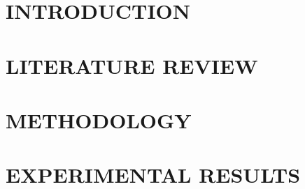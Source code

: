 \documentclass[a4paper,13pt,3p,oneside]{report}
\theoremstyle{definition}
\begin{document}
\renewcommand{\listtablename}{LIST OF TABLES}
{\let\oldnumberline\numberline
\renewcommand{\numberline}{Table~\oldnumberline}
\listoftables}

\glsaddall 
\renewcommand*{\acronymname}{LIST OF ABBREVIATIONS}
\renewcommand*{\entryname}{Abbreviation}
\renewcommand*{\descriptionname}{Definition}
\printnoidxglossaries

\renewcommand\appendixname{APPENDIX}
\renewcommand\appendixpagename{APPENDIX}
\renewcommand\appendixtocname{APPENDIX}

\renewcommand{\figurename}{Figure}
\renewcommand{\tablename}{Table}
\renewcommand{\chaptername}{CHAPTER}



\newpage
{}

\pagestyle{fancy}
\fancyhf{}
\fancyhead[RE, LO]{\leftmark}
\fancyfoot[LO]{\thepage}

\chapter{INTRODUCTION}
\label{chapter:intro}

\newpage
\chapter{LITERATURE REVIEW}
\label{chapter:literature}



\newpage
\chapter{METHODOLOGY}
\label{chapter:method}


\newpage
\chapter{EXPERIMENTAL RESULTS}
\label{chapter:experiment}

\end{document}
